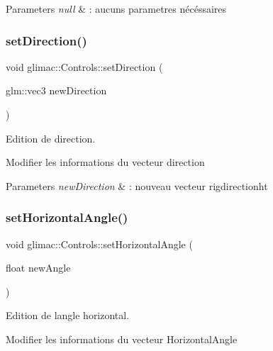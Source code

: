 \begin{DoxyParams}{Parameters}
{\em null} & \+: aucuns parametres nécéssaires \\
\hline
\end{DoxyParams}
\mbox{\label{classglimac_1_1Controls_aeecf9a01133bdfa844e6282437601a00}} 
\subsubsection{\texorpdfstring{set\+Direction()}{setDirection()}}
{\footnotesize\ttfamily void glimac\+::\+Controls\+::set\+Direction (\begin{DoxyParamCaption}\item[{glm\+::vec3}]{new\+Direction }\end{DoxyParamCaption})}



Edition de direction. 

Modifier les informations du vecteur direction


\begin{DoxyParams}{Parameters}
{\em new\+Direction} & \+: nouveau vecteur rigdirectionht \\
\hline
\end{DoxyParams}
\mbox{\label{classglimac_1_1Controls_a30b750a3e70f3a273a2abc6bc4932896}} 
\subsubsection{\texorpdfstring{set\+Horizontal\+Angle()}{setHorizontalAngle()}}
{\footnotesize\ttfamily void glimac\+::\+Controls\+::set\+Horizontal\+Angle (\begin{DoxyParamCaption}\item[{float}]{new\+Angle }\end{DoxyParamCaption})}



Edition de l\textquotesingle{}angle horizontal. 

Modifier les informations du vecteur Horizontal\+Angle


